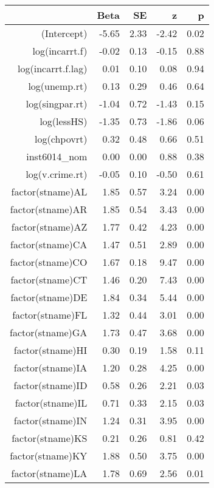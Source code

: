 \begin{table}[ht]
\centering
\begin{tabular}{rrrrr}
  \hline
 & Beta & SE & z & p \\ 
  \hline
(Intercept) & -5.65 & 2.33 & -2.42 & 0.02 \\ 
  log(incarrt.f) & -0.02 & 0.13 & -0.15 & 0.88 \\ 
  log(incarrt.f.lag) & 0.01 & 0.10 & 0.08 & 0.94 \\ 
  log(unemp.rt) & 0.13 & 0.29 & 0.46 & 0.64 \\ 
  log(singpar.rt) & -1.04 & 0.72 & -1.43 & 0.15 \\ 
  log(lessHS) & -1.35 & 0.73 & -1.86 & 0.06 \\ 
  log(chpovrt) & 0.32 & 0.48 & 0.66 & 0.51 \\ 
  inst6014\_nom & 0.00 & 0.00 & 0.88 & 0.38 \\ 
  log(v.crime.rt) & -0.05 & 0.10 & -0.50 & 0.61 \\ 
  factor(stname)AL & 1.85 & 0.57 & 3.24 & 0.00 \\ 
  factor(stname)AR & 1.85 & 0.54 & 3.43 & 0.00 \\ 
  factor(stname)AZ & 1.77 & 0.42 & 4.23 & 0.00 \\ 
  factor(stname)CA & 1.47 & 0.51 & 2.89 & 0.00 \\ 
  factor(stname)CO & 1.67 & 0.18 & 9.47 & 0.00 \\ 
  factor(stname)CT & 1.46 & 0.20 & 7.43 & 0.00 \\ 
  factor(stname)DE & 1.84 & 0.34 & 5.44 & 0.00 \\ 
  factor(stname)FL & 1.32 & 0.44 & 3.01 & 0.00 \\ 
  factor(stname)GA & 1.73 & 0.47 & 3.68 & 0.00 \\ 
  factor(stname)HI & 0.30 & 0.19 & 1.58 & 0.11 \\ 
  factor(stname)IA & 1.20 & 0.28 & 4.25 & 0.00 \\ 
  factor(stname)ID & 0.58 & 0.26 & 2.21 & 0.03 \\ 
  factor(stname)IL & 0.71 & 0.33 & 2.15 & 0.03 \\ 
  factor(stname)IN & 1.24 & 0.31 & 3.95 & 0.00 \\ 
  factor(stname)KS & 0.21 & 0.26 & 0.81 & 0.42 \\ 
  factor(stname)KY & 1.88 & 0.50 & 3.75 & 0.00 \\ 
  factor(stname)LA & 1.78 & 0.69 & 2.56 & 0.01 \\ 

\end{tabular}
\end{table}
